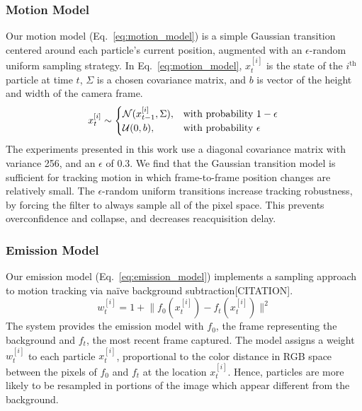 \documentclass{aamas2013}
\providecommand{\norm}[1]{\lVert#1\rVert}
\begin{document}
\subsubsection{Motion Model}
Our motion model (Eq.~\ref{eq:motion_model}) is a simple Gaussian transition 
centered around each particle's current position, augmented with an 
$\epsilon$-random uniform sampling strategy. In Eq.~\ref{eq:motion_model}, 
$x^{[i]}_t$ is the state of the $i^\text{th}$ particle at time $t$, $\Sigma$ 
is a chosen covariance matrix, and $b$ is vector of the height and width of 
the camera frame.
\begin{equation}
\label{eq:motion_model}
x^{[i]}_t \sim \begin{cases}
\mathcal{N}(x^{[i]}_{t-1}, \Sigma), &\text{with probability } 1-\epsilon \\
\mathcal{U}(0,b),& \text{with probability } \epsilon \\
\end{cases}\\
\end{equation}
The experiments presented in this work use a diagonal covariance matrix 
with variance 256, and an $\epsilon$ of 0.3. We find that the Gaussian 
transition model is sufficient for tracking motion in which frame-to-frame 
position changes are relatively small. The $\epsilon$-random uniform 
transitions increase tracking robustness, by forcing the filter to always 
sample all of the pixel space. This prevents overconfidence and collapse, 
and decreases reacquisition delay. 

\subsubsection{Emission Model}
Our emission model (Eq.~\ref{eq:emission_model}) implements a sampling
approach to motion tracking via na\"{i}ve background subtraction[CITATION].
\begin{equation}
\label{eq:emission_model}
w^{[i]}_t = 1 + \norm{f_0(x^{[i]}_t)-f_t(x^{[i]}_t)}^2
\end{equation} 
The system provides the emission model with $f_0$, the frame representing 
the background and $f_t$, the most recent frame captured. The model assigns 
a weight $w^{[i]}_t$ to each particle $x^{[i]}_t$, proportional to the color 
distance in RGB space between the pixels of $f_0$ and $f_t$ at the location 
$x^{[i]}_t$. Hence, particles are more likely to be resampled in portions of 
the image which appear different from the background.
\end{document}
